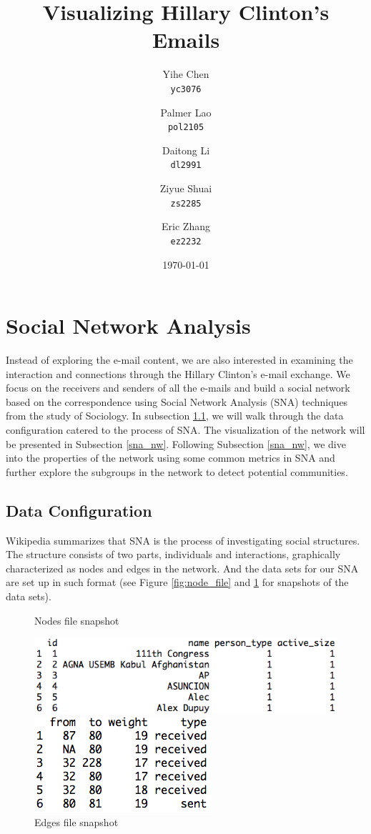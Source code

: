 \documentclass[11pt]{article}
\begin{document}
\title{Visualizing Hillary Clinton's Emails}

\author{
  Yihe Chen \\
  \texttt{yc3076}
  \and 
  Palmer Lao \\
  \texttt{pol2105}
  \and
  Daitong Li \\
  \texttt{dl2991}
  \and
  Ziyue Shuai \\
  \texttt{zs2285}
  \and
  Eric Zhang \\ 
  \texttt{ez2232}
}

\date{\today}
\maketitle
\section{Social Network Analysis}
Instead of exploring the e-mail content, we are also interested in examining the interaction and connections through the Hillary Clinton's e-mail exchange. We focus on the receivers and senders of all the e-mails and build a social network based on the correspondence using Social Network Analysis (SNA) techniques from the study of Sociology. In subsection \ref{sna_data}, we will walk through the data configuration catered to the process of SNA. The visualization of the network will be presented in Subsection \ref{sna_nw}. Following Subsection \ref{sna_nw}, we dive into the properties of the network using some common metrics in SNA and further explore the subgroups in the network to detect potential communities.
\subsection{Data Configuration}\label{sna_data}
Wikipedia summarizes that SNA  is the process of investigating social structures\cite{wiki_sna}. The structure consists of two parts, individuals and interactions, graphically characterized as nodes and edges in the network. And the data sets for our SNA are set up in such format (see Figure \ref{fig:node_file} and \ref{fig:edge_file} for snapshots of the data sets).
\begin{figure}[ht]
\caption{Nodes file snapshot}
\label{fig:node_file}
\centering
\includegraphics[width=.68\textwidth]{report_node_file}

\caption{Edges file snapshot}
\label{fig:edge_file}
\centering
\includegraphics[width=.35\textwidth]{report_edge_file}
\end{figure}
\end{document}
